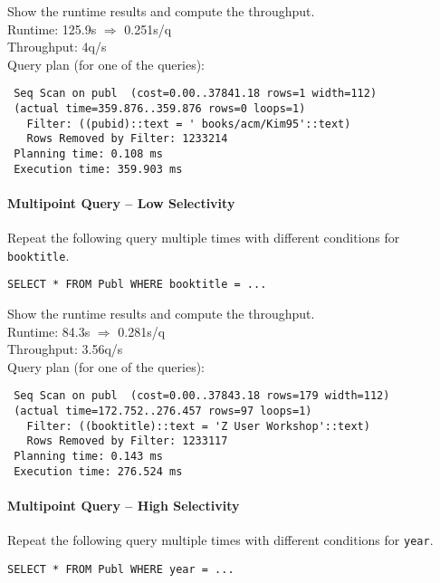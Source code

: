 \documentclass[11pt]{scrartcl}
\begin{document}
\smallskip\noindent
Show the runtime results and compute the throughput.\\
Runtime: 125.9s $\Rightarrow$ 0.251s/q\\
Throughput: 4q/s\\

\smallskip\noindent
Query plan (for one of the queries):
{\small
\begin{verbatim}
 Seq Scan on publ  (cost=0.00..37841.18 rows=1 width=112)
 (actual time=359.876..359.876 rows=0 loops=1)
   Filter: ((pubid)::text = ' books/acm/Kim95'::text)
   Rows Removed by Filter: 1233214
 Planning time: 0.108 ms
 Execution time: 359.903 ms
\end{verbatim}
}


\paragraph{Multipoint Query -- Low Selectivity}

Repeat the following query multiple times with different conditions for {\tt booktitle}.

{\small
\begin{verbatim}
SELECT * FROM Publ WHERE booktitle = ...
\end{verbatim}
}

\noindent
\condB[300]

\smallskip\noindent
Show the runtime results and compute the throughput.\\
Runtime: 84.3s $\Rightarrow$ 0.281s/q\\
Throughput: 3.56q/s\\

\smallskip\noindent
Query plan (for one of the queries):
{\small
\begin{verbatim}
 Seq Scan on publ  (cost=0.00..37843.18 rows=179 width=112)
 (actual time=172.752..276.457 rows=97 loops=1)
   Filter: ((booktitle)::text = 'Z User Workshop'::text)
   Rows Removed by Filter: 1233117
 Planning time: 0.143 ms
 Execution time: 276.524 ms
\end{verbatim}
}


\paragraph{Multipoint Query -- High Selectivity}

Repeat the following query multiple times with different conditions for {\tt year}.

{\small
\begin{verbatim}
SELECT * FROM Publ WHERE year = ...
\end{verbatim}
}
\end{document}
